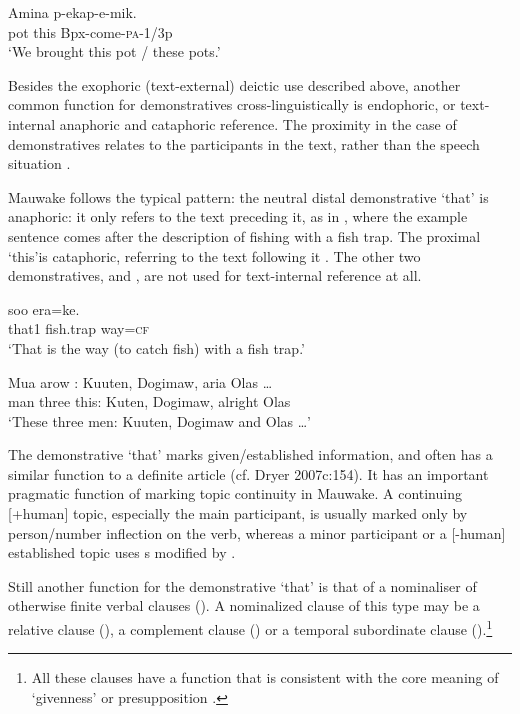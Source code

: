 \ea%
\label{ex:3:x638}
\gll Amina  p-ekap-e-mik. \\
pot this Bpx-come-\textsc{pa}-1/3p\\
\glt`We brought this pot / these pots.'
\z

Besides the exophoric (text-external) deictic use described above, another common function for demonstratives cross-linguistically is endophoric, or text-internal anaphoric and cataphoric reference. The proximity in the case of demonstratives relates to the participants in the text, rather than the speech situation \citep[278]{Lyons1968}. 

Mauwake follows the typical pattern: the neutral distal demonstrative  `that' is anaphoric: it only refers to the text preceding it, as in , where the example sentence comes after the description of fishing with a fish trap. The proximal  `this'is cataphoric, referring to the text following it . The other two demonstratives,  and , are not used for text-internal reference at all.

\ea%
\label{ex:3:x639}
\gll {} soo era=ke. \\
that1 fish.trap way=\textsc{cf}\\
\glt`That is the way (to catch fish) with a fish trap.'
\z

\ea%
\label{ex:3:x640}
\gll Mua arow : Kuuten, Dogimaw, aria Olas {\dots} \\
man three this: Kuten, Dogimaw, alright Olas\\
\glt`These three men: Kuuten, Dogimaw and Olas {\dots}'
\z

The demonstrative  `that' marks given/established information, and often has a similar function to a definite article (cf. Dryer 2007c:154). It has an important pragmatic function of marking topic continuity in Mauwake. A continuing [+human] topic, especially the main participant, is usually marked only by person/number inflection on the verb, whereas a minor participant or a [-human] established topic uses s modified by .

Still another function for the demonstrative  `that' is that of a nominaliser of otherwise finite verbal clauses (). A nominalized clause of this type may be a relative clause  (), a complement clause  () or a temporal subordinate clause  ().\footnote{All these clauses have a function that is consistent with the core meaning of `givenness' \citep{Haiman1978} or presupposition \citep{Reesink1987}.}

